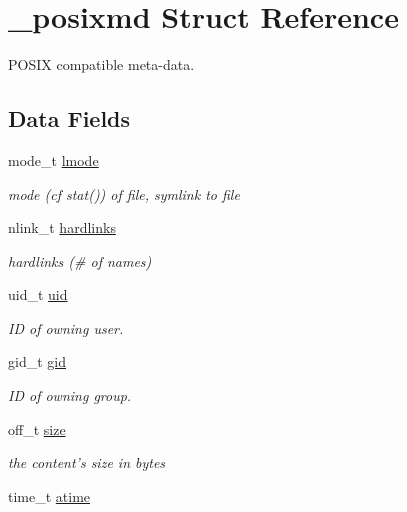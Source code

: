 \hypertarget{struct__posixmd}{
\section{\_\-posixmd Struct Reference}
\label{struct__posixmd}
}
POSIX compatible meta-data.  


\subsection*{Data Fields}
\begin{CompactItemize}
\item 
\hypertarget{struct__posixmd_o1}{
mode\_\-t \hyperlink{struct__posixmd_o1}{lmode}}
\label{struct__posixmd_o1}

\begin{CompactList}\small\item\em mode (cf stat()) of file, symlink to file \item\end{CompactList}\item 
\hypertarget{struct__posixmd_o2}{
nlink\_\-t \hyperlink{struct__posixmd_o2}{hardlinks}}
\label{struct__posixmd_o2}

\begin{CompactList}\small\item\em hardlinks (\# of names) \item\end{CompactList}\item 
\hypertarget{struct__posixmd_o3}{
uid\_\-t \hyperlink{struct__posixmd_o3}{uid}}
\label{struct__posixmd_o3}

\begin{CompactList}\small\item\em ID of owning user. \item\end{CompactList}\item 
\hypertarget{struct__posixmd_o4}{
gid\_\-t \hyperlink{struct__posixmd_o4}{gid}}
\label{struct__posixmd_o4}

\begin{CompactList}\small\item\em ID of owning group. \item\end{CompactList}\item 
\hypertarget{struct__posixmd_o5}{
off\_\-t \hyperlink{struct__posixmd_o5}{size}}
\label{struct__posixmd_o5}

\begin{CompactList}\small\item\em the content's size in bytes \item\end{CompactList}\item 
\hypertarget{struct__posixmd_o6}{
time\_\-t \hyperlink{struct__posixmd_o6}{atime}}
\label{struct__posixmd_o6}


\end{CompactItemize}
